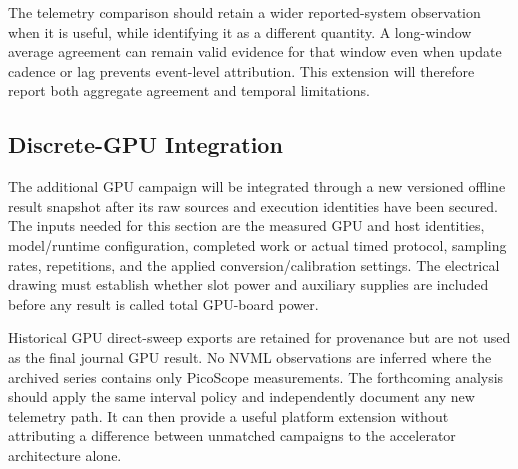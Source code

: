 The telemetry comparison should retain a wider reported-system observation when it is useful, while identifying it as a different quantity. A long-window average agreement can remain valid evidence for that window even when update cadence or lag prevents event-level attribution. This extension will therefore report both aggregate agreement and temporal limitations.

\subsection{Discrete-GPU Integration}
The additional GPU campaign will be integrated through a new versioned offline result snapshot after its raw sources and execution identities have been secured. The inputs needed for this section are the measured GPU and host identities, model/runtime configuration, completed work or actual timed protocol, sampling rates, repetitions, and the applied conversion/calibration settings. The electrical drawing must establish whether slot power and auxiliary supplies are included before any result is called total GPU-board power.

Historical GPU direct-sweep exports are retained for provenance but are not used as the final journal GPU result. No NVML observations are inferred where the archived series contains only PicoScope measurements. The forthcoming analysis should apply the same interval policy and independently document any new telemetry path. It can then provide a useful platform extension without attributing a difference between unmatched campaigns to the accelerator architecture alone.

